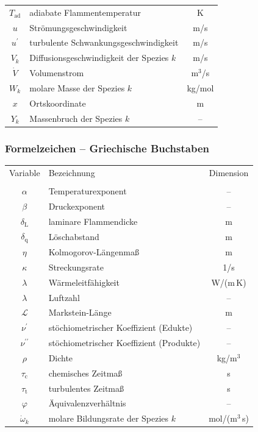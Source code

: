 \begin{tabularx}{\textwidth}{cXc}
  $T_\mathrm{ad}$  & adiabate Flammentemperatur             & K \\
  $u$              & Strömungsgeschwindigkeit               & m/s \\
  $u^{\prime}$     & turbulente Schwankungsgeschwindigkeit  & m/s \\
  $V_k$            & Diffusionsgeschwindigkeit der Spezies $k$ & m/s \\
  $\dot{V}$        & Volumenstrom                           & m$^3$/s \\
  $W_k$            & molare Masse der Spezies $k$           & kg/mol \\
  $x$              & Ortskoordinate                         & m \\
  $Y_k$            & Massenbruch der Spezies $k$            & -- \\
\end{tabularx}


\subsubsection{Formelzeichen -- Griechische Buchstaben}

\begin{tabularx}{\textwidth}{cXc}
Variable & Bezeichnung & Dimension \\ \\
  $\alpha$              & Temperaturexponent                     & -- \\
  $\beta$               & Druckexponent                          & -- \\
  $\delta_\mathrm{L}$   & laminare Flammendicke                  & m \\
  $\delta_\mathrm{q}$   & Löschabstand                           & m \\
  $\eta$                & Kolmogorov-Längenmaß                   & m \\
  $\kappa$              & Streckungsrate                         & 1/s \\
  $\lambda$             & Wärmeleitfähigkeit                     & W/(m\,K) \\
  $\lambda$             & Luftzahl                               & -- \\
  $\mathcal{L}$         & Markstein-Länge                        & m \\
  $\nu^{\prime}$        & stöchiometrischer Koeffizient (Edukte) & -- \\
  $\nu^{\prime\prime}$  & stöchiometrischer Koeffizient (Produkte) & -- \\
  $\rho$                & Dichte                                 & kg/m$^3$ \\
  $\tau_\mathrm{c}$     & chemisches Zeitmaß                     & s \\
  $\tau_\mathrm{t}$     & turbulentes Zeitmaß                    & s \\
  $\varphi$             & Äquivalenzverhältnis                   & -- \\
  $\dot{\omega}_k$      & molare Bildungsrate der Spezies $k$    & mol/(m$^3$\,s) \\
\end{tabularx}


